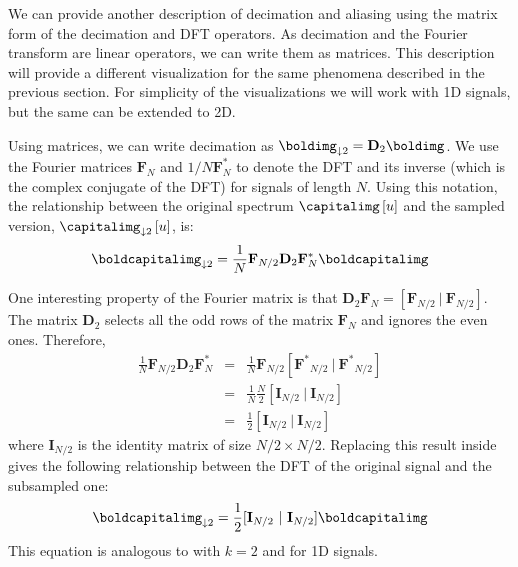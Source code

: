 
We can provide another description of decimation and aliasing using the matrix form of the decimation and DFT operators. As decimation and the Fourier transform are linear operators, we can write them as matrices. 
This description will provide a different visualization for the same phenomena described in the previous section. For simplicity of the visualizations we will work with 1D signals, but the same can be extended to 2D.

Using matrices, we can write decimation as $\boldimg_{\downarrow 2} = \mathbf{D}_2 \boldimg$. We use the Fourier matrices $\mathbf {F}_{N}$ and $1/N \mathbf {F}^{*}_{N}$ to denote the DFT and its inverse  (which is the complex conjugate of the DFT) for signals of length $N$. Using this notation, the relationship between the original spectrum $\capitalimg \left[u\right]$ and the sampled version, $\capitalimg_{\downarrow 2} \left[u\right]$, is:
\begin{equation}
\boldcapitalimg_{\downarrow 2} = \frac{1}{N} \mathbf{F}_{N/2} \mathbf{D}_2 \mathbf{F}^{*}_{N} \boldcapitalimg
\label{eq:matrixformsubsampling}
\end{equation}

One interesting property of the Fourier matrix is that $\mathbf{D}_2 \mathbf{F}_{N} = [\mathbf{F}_{N/2} ~|~ \mathbf{F}_{N/2}]$. The matrix $\mathbf{D}_2$ selects all the odd rows of the matrix $\mathbf{F}_{N}$ and ignores the even ones. Therefore, 
\begin{eqnarray}
\frac{1}{N} \mathbf{F}_{N/2} \mathbf{D}_2 \mathbf{F}^{*}_{N} &=& \frac{1}{N}\mathbf{F}_{N/2}  [\mathbf{F^*}_{N/2} ~|~ \mathbf{F^*}_{N/2}] \\
&=& \frac{1}{N} \frac{N}{2} [\mathbf{I}_{N/2} ~|~ \mathbf{I}_{N/2}] \\
&=& \frac{1}{2} [\mathbf{I}_{N/2} ~|~ \mathbf{I}_{N/2}]
\end{eqnarray}
where $\mathbf{I}_{N/2}$ is the identity matrix of size $N/2 \times N/2$. Replacing this result inside \eqn{\ref{eq:matrixformsubsampling}} gives the following relationship between the DFT of the original signal and the subsampled one:
\begin{equation}
\boldcapitalimg_{\downarrow 2} = \frac{1}{2} [\mathbf{I}_{N/2} ~|~ \mathbf{I}_{N/2}] \boldcapitalimg
\end{equation}
This equation is analogous to \eqn{\ref{eq:decimationFT}} with $k=2$ and for 1D signals.

